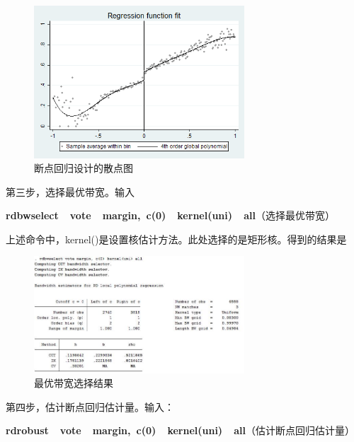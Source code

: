 \documentclass[cn,12pt,math=newtx,citestyle=gb7714-2015,bibstyle=gb7714-2015]{elegantbook}
\begin{document}
	\begin{figure}[htbp]
		\centering
		\includegraphics[width=0.7\textwidth]{rdgraph.png}
		\caption{断点回归设计的散点图}\label{fig:digit}
	\end{figure}
	
	第三步，选择最优带宽。输入
	
	\textbf{rdbwselect~~vote~~margin,~c(0)~~kernel(uni)~~all}（选择最优带宽）
	
	上述命令中，kernel()是设置核估计方法。此处选择的是矩形核。得到的结果是
	
	\begin{figure}[htbp]
		\centering
		\includegraphics[width=0.7\textwidth]{rdbw.jpg}
		\caption{最优带宽选择结果}\label{fig:digit}
	\end{figure}
	
	第四步，估计断点回归估计量。输入：
	
	\textbf{rdrobust~~vote~~margin,~c(0)~~kernel(uni)~~all}（估计断点回归估计量）
	
\end{document}
